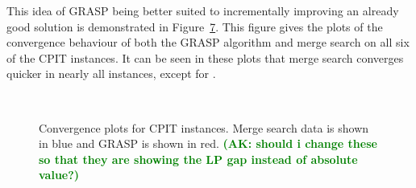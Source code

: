 \documentclass[preprint]{elsarticle}
\newcommand{\ak}[1]{\textbf{\textcolor{green}{(AK: #1)}}}
\begin{document}
This idea of GRASP being better suited to incrementally improving an already good solution is demonstrated in Figure~\ref{plot:mine:runtime}. This figure gives the plots of the convergence behaviour of both the GRASP algorithm and merge search on all six of the CPIT instances. It can be seen in these plots that merge search converges quicker in nearly all instances, except for \dmine{}. 

\begin{figure}[!]
    \centering
    \begin{subfigure}[t]{0.3\textwidth}
    \centering
    \vspace*{-7mm}\caption{\newman{}}
    \label{plot:newman-conv}
    \end{subfigure}
    \quad
    \begin{subfigure}[t]{0.3\textwidth}
    \centering
    \vspace*{-7mm}\caption{\zucksmall{}}
    \label{plot:zuck-small-conv}
    \end{subfigure}
    \quad
    \begin{subfigure}[t]{0.3\textwidth}
    \centering
    \vspace*{-7mm}\caption{\dmine{}}
    \label{plot:kd-conv}
    \end{subfigure}
    \\[5mm]
    \begin{subfigure}[t]{0.3\textwidth}
    \centering
    \vspace*{-7mm}\caption{\zuckmed{}}
    \label{plot:zuck-med-conv}
    \end{subfigure}
    \quad
    \begin{subfigure}[t]{0.3\textwidth}
    \centering
    \vspace*{-7mm}\caption{\marvin{}}
    \label{plot:marvin-conv}
    \end{subfigure}
    \quad
    \begin{subfigure}[t]{0.3\textwidth}
    \centering
    \vspace*{-7mm}\caption{\zucklarge{}}
    \label{plot:zuck-large-conv}
    \end{subfigure}
    \caption[Convergence plots for merge search on CPIT instances]{Convergence plots for CPIT instances. Merge search data is shown in blue and GRASP is shown in red. \ak{should i change these so that they are showing the LP gap instead of absolute value?}}
    \label{plot:mine:runtime}
\end{figure}
\end{document}
